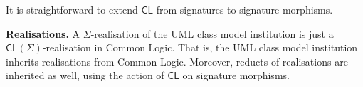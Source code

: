 \documentclass[10pt, a4paper]{isov2}
\newcommand*{\CL}{\ensuremath{\mathsf{CL}}\xspace}
\begin{document}
It is straightforward to extend $\CL$
from signatures to signature morphisms.

\medskip\noindent\textbf{Realisations.}
A $\Sigma$-realisation of the UML class model institution is just a
$\CL(\Sigma)$-realisation in Common Logic. That is, the UML class model
institution inherits realisations from Common Logic. Moreover, reducts
of realisations
are inherited as well, using the action of $\CL$ on signature morphisms.





\end{document}
